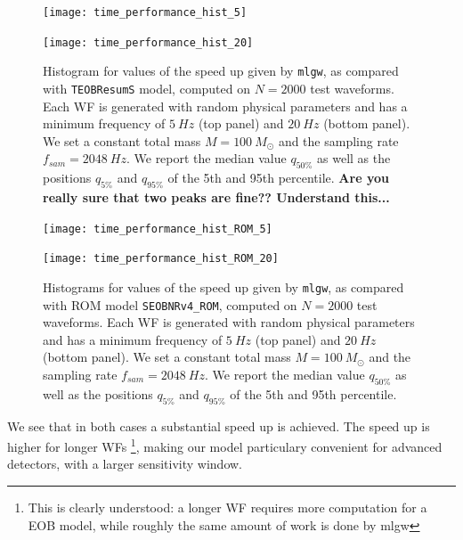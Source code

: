 \newcommand{\factor}{.9}
\begin{figure}
	\centering
	\begin{minipage}{\factor\linewidth}
	    \texttt{[image: time\_performance\_hist\_5]}
	\end{minipage}\hfill
	\begin{minipage}{\factor\linewidth}
	    \texttt{[image: time\_performance\_hist\_20]}
	\end{minipage}

	\caption{
Histogram for values of the speed up given by \texttt{mlgw}, as compared with \texttt{TEOBResumS} model, computed on $N=2000$ test waveforms. Each WF is generated with random physical parameters and has a minimum frequency of $\SI{5}{Hz}$ (top panel) and $\SI{20}{Hz}$ (bottom panel).
We set a constant total mass $M=\SI{100}{M_\odot}$ and the sampling rate $f_{sam} = \SI{2048}{Hz}$.
We report the median value $q_{50\%}$ as well as the positions $q_{5\%}$ and $q_{95\%}$ of the 5th and 95th percentile.
\textbf{Are you really sure that two peaks are fine?? Understand this...}
}
	\label{fig:time_performance_hist}
\end{figure}
\begin{figure}
	\centering
	\begin{minipage}{\factor\linewidth}
	    \texttt{[image: time\_performance\_hist\_ROM\_5]}
	\end{minipage}\hfill
	\begin{minipage}{\factor\linewidth}
	    \texttt{[image: time\_performance\_hist\_ROM\_20]}
	\end{minipage}

	\caption{
Histograms for values of the speed up given by \texttt{mlgw}, as compared with ROM model \texttt{SEOBNRv4\_ROM}, computed on $N=2000$ test waveforms. Each WF is generated with random physical parameters and has a minimum frequency of $\SI{5}{Hz}$ (top panel) and $\SI{20}{Hz}$ (bottom panel).
We set a constant total mass $M=\SI{100}{M_\odot}$ and the sampling rate $f_{sam} = \SI{2048}{Hz}$.
We report the median value $q_{50\%}$ as well as the positions $q_{5\%}$ and $q_{95\%}$ of the 5th and 95th percentile.
}
	\label{fig:time_performance_hist_ROM}
\end{figure}

We see that in both cases a substantial speed up is achieved. The speed up is higher for longer WFs
\footnote{This is clearly understood: a longer WF requires more computation for a EOB model, while roughly the same amount of work is done by mlgw}, 
making our model particulary convenient for advanced detectors, with a larger sensitivity window.
\par

